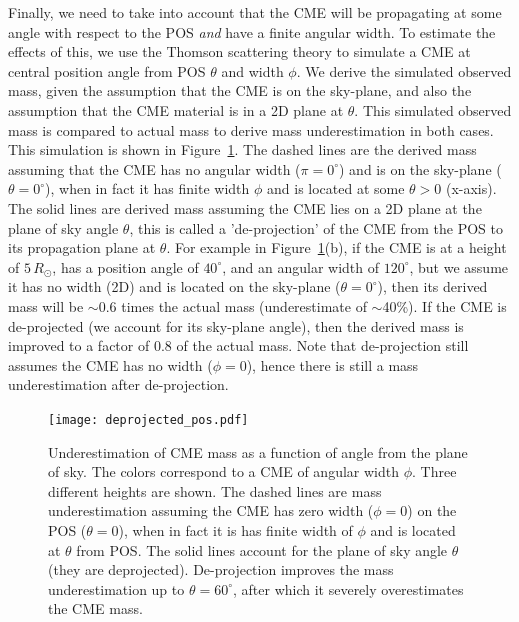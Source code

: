 Finally, we need to take into account that the CME will be propagating at some angle with respect to the POS \emph{and} have a finite angular width. To estimate the effects of this, we use the Thomson scattering theory to simulate a CME at central position angle from POS $\theta$ and width $\phi$. We derive the simulated observed mass, given the assumption that the CME is on the sky-plane, and also the assumption that the CME material is in a 2D plane at $\theta$. This simulated observed mass is compared to actual mass to derive mass underestimation in both cases.
This simulation is shown in Figure~\ref{fig:deprojection}. The dashed lines are the derived mass assuming that the CME has no angular width ($\pi=0^{\circ}$) and is on the sky-plane ($\theta=0^{\circ}$), when in fact it has finite width $\phi$ and is located at some $\theta >0$ (x-axis). The solid lines are derived mass assuming the CME lies on a 2D plane at the plane of sky angle $\theta$, this is called a 'de-projection' of the CME from the POS to its propagation plane at $\theta$. For example in Figure~\ref{fig:deprojection}(b), if the CME is at a height of $5\,R_{\odot}$, has a position angle of $40^{\circ}$, and an angular width of $120^{\circ}$, but we assume it has no width (2D) and is located on the sky-plane ($\theta=0^{\circ}$), then its derived mass will be $\sim$0.6 times the actual mass (underestimate of $\sim$40\%). If the CME is de-projected (we account for its sky-plane angle), then the derived mass is improved to a factor of 0.8 of the actual mass. Note that de-projection still assumes the CME has no width ($\phi=0$), hence there is still a mass underestimation after de-projection.
\begin{figure}[!ht]
\begin{center}
\texttt{[image: deprojected\_pos.pdf]}
\caption[Uncertainty due to unknown POS angle and angular width]{Underestimation of CME mass as a function of angle from the plane of sky. The colors correspond to a CME of angular width $\phi$. Three different heights are shown. The dashed lines are mass underestimation assuming the CME has zero width ($\phi=0$) on the POS ($\theta=0$), when in fact it is has finite width of $\phi$ and is located at $\theta$ from POS. The solid lines account for the plane of sky angle $\theta$ (they are deprojected). De-projection improves the mass underestimation up to $\theta=60^{\circ}$, after which it severely overestimates the CME mass.}
\label{fig:deprojection}
\end{center}
\end{figure}
\clearpage

